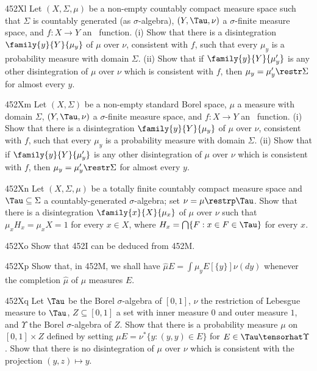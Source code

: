 {\sqheader 452Xl Let $(X,\Sigma,\mu)$ be a non-empty countably compact
measure space such that $\Sigma$ is countably generated (as
$\sigma$-algebra), $(Y,\Tau,\nu)$ a $\sigma$-finite measure space,
and $f:X\to Y$ an \imp\ function.   (i) Show that there is a
disintegration
$\family{y}{Y}{\mu_y}$ of $\mu$ over $\nu$, consistent with $f$, such
that every
$\mu_y$ is a probability measure with domain $\Sigma$.   (ii) Show
that if $\family{y}{Y}{\mu'_y}$ is any other disintegration of $\mu$
over $\nu$ which is consistent with $f$, then $\mu_y=\mu'_y\restr\Sigma$
for almost every $y$.

\spheader 452Xm Let $(X,\Sigma)$ be a non-empty standard Borel space,
$\mu$ a measure with domain $\Sigma$, $(Y,\Tau,\nu)$ a $\sigma$-finite
measure space,
and $f:X\to Y$ an \imp\ function.   (i) Show that there is a
disintegration
$\family{y}{Y}{\mu_y}$ of $\mu$ over $\nu$, consistent with $f$, such
that every
$\mu_y$ is a probability measure with domain $\Sigma$.   (ii) Show
that if $\family{y}{Y}{\mu'_y}$ is any other disintegration of $\mu$
over $\nu$ which is consistent with $f$, then $\mu_y=\mu'_y\restr\Sigma$
for almost every $y$.

\spheader 452Xn Let $(X,\Sigma,\mu)$ be a totally finite countably
compact measure space and $\Tau\subseteq\Sigma$ a countably-generated
$\sigma$-algebra;  set $\nu=\mu\restrp\Tau$.   Show that there is a
disintegration $\family{x}{X}{\mu_x}$ of $\mu$ over $\nu$ such that
$\mu_xH_x=\mu_xX=1$ for every $x\in X$, where
$H_x=\bigcap\{F:x\in F\in\Tau\}$ for every $x$.   

\spheader 452Xo Show that 452I can be deduced from 452M.   

\spheader 452Xp Show that, in 452M, we shall have
$\hat\mu E=\int\mu_y E[\{y\}]\nu(dy)$ whenever the completion
$\hat\mu$ of $\mu$ measures $E$.

\sqheader 452Xq Let $\Tau$ be the Borel $\sigma$-algebra of $[0,1]$,
$\nu$ the restriction of Lebesgue measure to $\Tau$, $Z\subseteq[0,1]$ a
set with inner measure
$0$ and outer measure $1$, and $\Upsilon$ the Borel $\sigma$-algebra of
$Z$.   Show that there is a probability measure $\mu$ on $[0,1]\times Z$
defined by setting
$\mu E=\nu^*\{y:(y,y)\in E\}$ for $E\in\Tau\tensorhat\Upsilon$.   Show
that there is no disintegration of $\mu$ over $\nu$ which is consistent
with the projection
$(y,z)\mapsto y$.

}
